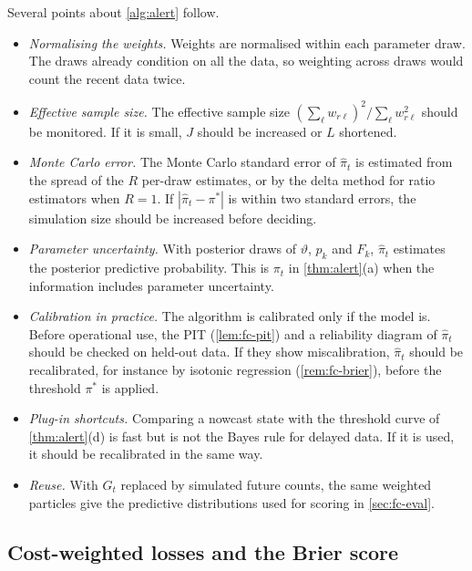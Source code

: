 Several points about \cref{alg:alert} follow.
\begin{itemize}
  \item \emph{Normalising the weights.} Weights are normalised within each parameter
  draw. The draws already condition on all the data, so weighting across draws would
  count the recent data twice.
  \item \emph{Effective sample size.} The effective sample size
  $(\sum_\ell w_{r\ell})^2/\sum_\ell w_{r\ell}^2$ should be monitored. If it is small,
  $J$ should be increased or $L$ shortened.
  \item \emph{Monte Carlo error.} The Monte Carlo standard error of $\hat\pi_t$ is
  estimated from the spread of the $R$ per-draw estimates, or by the delta method for
  ratio estimators when $R=1$. If $|\hat\pi_t-\pi^*|$ is within two standard errors,
  the simulation size should be increased before deciding.
  \item \emph{Parameter uncertainty.} With posterior draws of $\vartheta$, $p_k$ and $F_k$,
  $\hat\pi_t$ estimates the posterior predictive probability. This is $\pi_t$ in
  \cref{thm:alert}(a) when the information includes parameter uncertainty.
  \item \emph{Calibration in practice.} The algorithm is calibrated only if the model
  is. Before operational use, the PIT (\cref{lem:fc-pit}) and a reliability diagram of
  $\hat\pi_t$ should be checked on held-out data. If they show miscalibration,
  $\hat\pi_t$ should be recalibrated, for instance by isotonic regression
  (\cref{rem:fc-brier}), before the threshold $\pi^*$ is applied.
  \item \emph{Plug-in shortcuts.} Comparing a nowcast state with the threshold curve of
  \cref{thm:alert}(d) is fast but is not the Bayes rule for delayed data. If it is
  used, it should be recalibrated in the same way.
  \item \emph{Reuse.} With $G_t$ replaced by simulated future counts, the same weighted
  particles give the predictive distributions used for scoring in
  \cref{sec:fc-eval}.
\end{itemize}

\subsection{Cost-weighted losses and the Brier score}\label{app:fc-brier}

